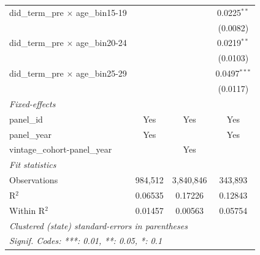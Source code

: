 \begin{tabular}{lccc}
   did\_term\_pre $\times$ age\_bin15-19     &                 &                 & 0.0225$^{**}$\\   
                                             &                 &                 & (0.0082)\\   
   did\_term\_pre $\times$ age\_bin20-24     &                 &                 & 0.0219$^{**}$\\   
                                             &                 &                 & (0.0103)\\   
   did\_term\_pre $\times$ age\_bin25-29     &                 &                 & 0.0497$^{***}$\\   
                                             &                 &                 & (0.0117)\\   
   \midrule
   \emph{Fixed-effects}\\
   panel\_id                                 & Yes             & Yes             & Yes\\  
   panel\_year                               & Yes             &                 & Yes\\  
   vintage\_cohort-panel\_year               &                 & Yes             & \\  
   \midrule
   \emph{Fit statistics}\\
   Observations                              & 984,512         & 3,840,846       & 343,893\\  
   R$^2$                                     & 0.06535         & 0.17226         & 0.12843\\  
   Within R$^2$                              & 0.01457         & 0.00563         & 0.05754\\  
   \midrule \midrule
   \multicolumn{4}{l}{\emph{Clustered (state) standard-errors in parentheses}}\\
   \multicolumn{4}{l}{\emph{Signif. Codes: ***: 0.01, **: 0.05, *: 0.1}}\\
\end{tabular}
\par\endgroup


